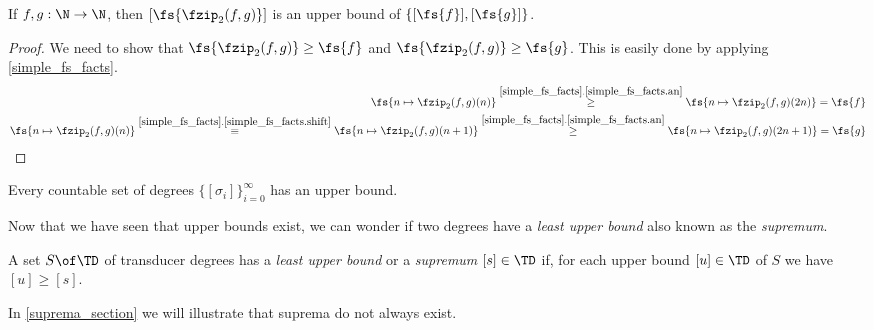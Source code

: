 \begin{lemma}\label{upper_bounds_functions}
	If $f,g: \N \to \N$, then $[\fs{\fzip_2(f,g)}]$ is an upper bound of $\{[\fs{f}],[\fs{g}]\}$.
	\begin{proof}
		We need to show that $\fs{\fzip_2(f,g)} \geq \fs{f}$ and $\fs{\fzip_2(f,g)} \geq \fs{g}$. This is easily done by applying \cref{simple_fs_facts}.
		\begin{align*}
			\fs{n \mapsto \fzip_2(f,g)(n)} \overset{\ref{simple_fs_facts}.\ref{simple_fs_facts.an}}{\geq} \fs{n \mapsto \fzip_2(f,g)(2n)} = \fs{f}\\
			\fs{n \mapsto \fzip_2(f,g)(n)} \overset{\ref{simple_fs_facts}.\ref{simple_fs_facts.shift}}{\equiv} \fs{n \mapsto \fzip_2(f,g)(n + 1)} \overset{\ref{simple_fs_facts}.\ref{simple_fs_facts.an}}{\geq} \fs{n \mapsto \fzip_2(f,g)(2n + 1)} = \fs{g}
		\end{align*}
	\end{proof}
\end{lemma}

\begin{lemma}
	Every countable set of degrees $\{[\sigma_i]\}_{i=0}^{\infty}$ has an upper bound.
\end{lemma}

Now that we have seen that upper bounds exist, we can wonder if two degrees have a \textit{least upper bound} also known as the \textit{supremum}.

\begin{definition}
	A set $S\of\TD$ of transducer degrees has a \textit{least upper bound} or a \textit{supremum} $[s]\in\TD$ if, for each upper bound $[u]\in\TD$ of $S$ we have $[u] \geq [s]$.
\end{definition}

In \cref{suprema_section} we will illustrate that suprema do not always exist.